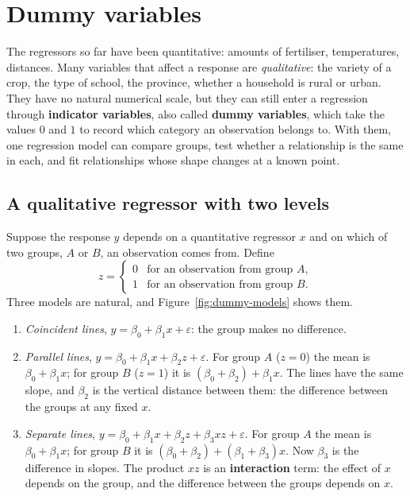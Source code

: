 \documentclass[11pt,a4paper]{article}
\numberwithin{equation}{section}
\theoremstyle{definition}
\begin{document}
\section{Dummy variables}
The regressors so far have been quantitative: amounts of fertiliser, temperatures, distances. Many
variables that affect a response are \emph{qualitative}: the variety of a crop, the type of school, the
province, whether a household is rural or urban. They have no natural numerical scale, but they can
still enter a regression through \textbf{indicator variables}, also called \textbf{dummy variables}, which
take the values $0$ and $1$ to record which category an observation belongs to. With them, one
regression model can compare groups, test whether a relationship is the same in each, and fit
relationships whose shape changes at a known point.

\subsection{A qualitative regressor with two levels}
Suppose the response $y$ depends on a quantitative regressor $x$ and on which of two groups, $A$ or
$B$, an observation comes from. Define
\[
z = \begin{cases} 0 & \text{for an observation from group } A, \\ 1 & \text{for an observation from group } B. \end{cases}
\]
Three models are natural, and Figure~\ref{fig:dummy-models} shows them.

\begin{enumerate}[label=(\roman*)]
\item \emph{Coincident lines}, $y = \beta_0 + \beta_1x + \varepsilon$: the group makes no difference.
\item \emph{Parallel lines}, $y = \beta_0 + \beta_1x + \beta_2z + \varepsilon$. For group $A$ ($z = 0$) the mean is
$\beta_0 + \beta_1x$; for group $B$ ($z = 1$) it is $(\beta_0 + \beta_2) + \beta_1x$. The lines have the same slope,
and $\beta_2$ is the vertical distance between them: the difference between the groups at any fixed $x$.
\item \emph{Separate lines}, $y = \beta_0 + \beta_1x + \beta_2z + \beta_3xz + \varepsilon$. For group $A$ the mean is
$\beta_0 + \beta_1x$; for group $B$ it is $(\beta_0 + \beta_2) + (\beta_1 + \beta_3)x$. Now $\beta_3$ is the difference in
slopes. The product $xz$ is an \textbf{interaction} term: the effect of $x$ depends on the group, and the
difference between the groups depends on $x$.
\end{enumerate}
\end{document}
